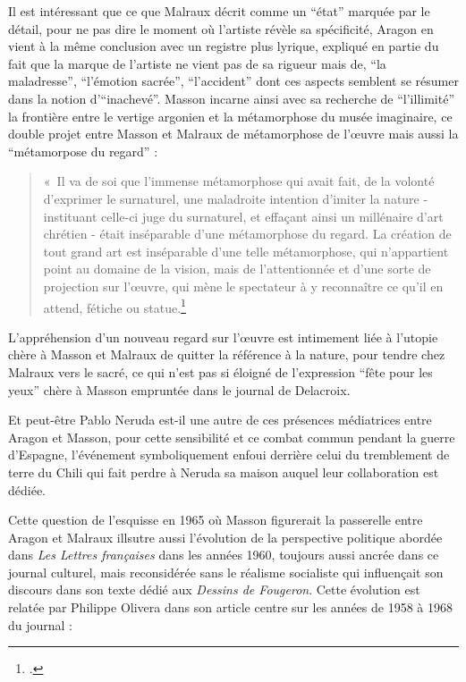 Il est intéressant que ce que Malraux décrit comme un \enquote{état} marquée par le détail, pour ne pas dire le moment où l'artiste révèle sa spécificité, Aragon en vient à la même conclusion avec un registre plus lyrique, expliqué en partie du fait que la marque de l'artiste ne vient pas de sa rigueur mais de, \enquote{la maladresse}, \enquote{l'émotion sacrée}, \enquote{l'accident} dont ces aspects semblent se résumer dans la notion d'\enquote{inachevé}. Masson incarne ainsi avec sa recherche de \enquote{l'illimité} la frontière entre le vertige argonien et la métamorphose du musée imaginaire, ce double projet entre Masson et Malraux de métamorphose de l'\oe{}uvre mais aussi la \enquote{métamorpose du regard} : 

\begin{quote}
« Il va de soi que l’immense métamorphose qui avait fait, de la volonté d’exprimer le surnaturel, une maladroite intention d’imiter la nature - instituant celle-ci juge du surnaturel, et effaçant ainsi un millénaire d’art chrétien - était inséparable d’une métamorphose du regard. La création de tout grand art est inséparable d’une telle métamorphose, qui n’appartient point au domaine de la vision, mais de l’attentionnée et d’une sorte de projection sur l’\oe{}uvre, qui mène le spectateur à y reconnaître ce qu’il en attend, fétiche ou statue.\footcite{p201}\end{quote}

L'appréhension d'un nouveau regard sur l'\oe{}uvre est intimement liée à l'utopie chère à Masson et Malraux de quitter la référence à la nature, pour tendre chez Malraux vers le sacré, ce qui n'est pas si éloigné de l'expression \enquote{fête pour les yeux} chère à Masson empruntée dans le journal de Delacroix. 

	 Et peut-être Pablo Neruda est-il une autre de ces présences médiatrices entre Aragon et Masson, pour cette sensibilité et ce combat commun pendant la guerre d'Espagne, l'événement symboliquement enfoui derrière celui du tremblement de terre du Chili qui fait perdre à Neruda sa maison auquel leur collaboration est dédiée. 

	Cette question de l'esquisse en 1965 où Masson figurerait la passerelle entre Aragon et Malraux illsutre aussi l'évolution de la perspective politique abordée dans \emph{Les Lettres françaises} dans les années 1960, toujours aussi ancrée dans ce journal culturel, mais reconsidérée sans le réalisme socialiste qui influençait son discours dans son texte dédié aux \emph{Dessins de Fougeron}. Cette évolution est relatée par Philippe Olivera dans son article centre sur les années de 1958 à 1968 du journal : 

